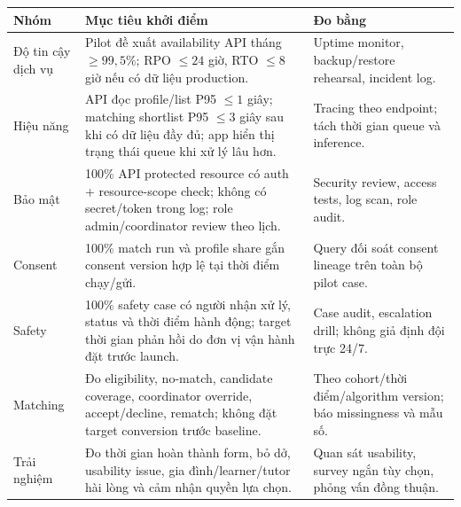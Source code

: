 \documentclass[11pt,a4paper]{article}
\begin{document}
\begin{tabularx}{\textwidth}{p{3.0cm}p{5.0cm}Y}
\toprule
\textbf{Nhóm} & \textbf{Mục tiêu khởi điểm} & \textbf{Đo bằng} \\
\midrule
Độ tin cậy dịch vụ & Pilot đề xuất availability API tháng \(\ge 99,5\%\); RPO \(\le 24\) giờ, RTO \(\le 8\) giờ nếu có dữ liệu production. & Uptime monitor, backup/restore rehearsal, incident log. \\
Hiệu năng & API đọc profile/list P95 \(\le 1\) giây; matching shortlist P95 \(\le 3\) giây sau khi có dữ liệu đầy đủ; app hiển thị trạng thái queue khi xử lý lâu hơn. & Tracing theo endpoint; tách thời gian queue và inference. \\
Bảo mật & 100\% API protected resource có auth + resource-scope check; không có secret/token trong log; role admin/coordinator review theo lịch. & Security review, access tests, log scan, role audit. \\
Consent & 100\% match run và profile share gắn consent version hợp lệ tại thời điểm chạy/gửi. & Query đối soát consent lineage trên toàn bộ pilot case. \\
Safety & 100\% safety case có người nhận xử lý, status và thời điểm hành động; target thời gian phản hồi do đơn vị vận hành đặt trước launch. & Case audit, escalation drill; không giả định đội trực 24/7. \\
Matching & Đo eligibility, no-match, candidate coverage, coordinator override, accept/decline, rematch; không đặt target conversion trước baseline. & Theo cohort/thời điểm/algorithm version; báo missingness và mẫu số. \\
Trải nghiệm & Đo thời gian hoàn thành form, bỏ dở, usability issue, gia đình/learner/tutor hài lòng và cảm nhận quyền lựa chọn. & Quan sát usability, survey ngắn tùy chọn, phỏng vấn đồng thuận. \\
\bottomrule
\end{tabularx}
\end{document}
